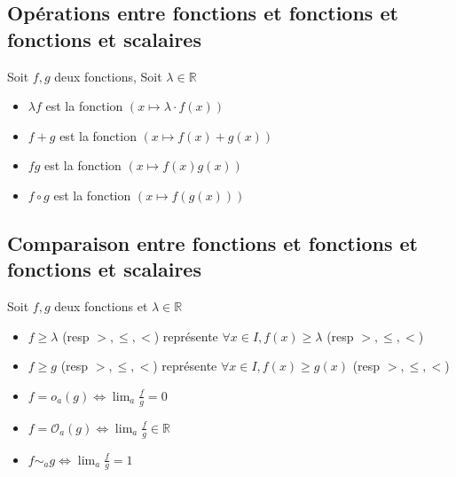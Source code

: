 \documentclass[11pt,colorlinks]{book}
\theoremstyle{mytheoremstyle}
\theoremstyle{mytheoremstyle}
\theoremstyle{mytheoremstyle}
\theoremstyle{mytheoremstyle}
\theoremstyle{mytheoremstyle}
\theoremstyle{mytheoremstyle}
\theoremstyle{mytheoremstyle}
\theoremstyle{mytheoremstyle}
\theoremstyle{myproblemstyle}
\def\mbb#1{\mathbb{#1}}
\def\bR{\mbb{R}}
\renewcommand{\equiv}{\sim}
\begin{document}
\subsection{Opérations entre fonctions et fonctions et fonctions et scalaires}
\begin{rmq}
  Soit $f,g$ deux fonctions, Soit $\lambda \in \bR$
  \begin{itemize}
    \item $\lambda f$ est la fonction $\left(x \mapsto \lambda \cdot f(x)\right)$
    \item $f+g$ est la fonction $\left(x \mapsto f(x)+g(x)\right)$
    \item $fg$ est la fonction $\left(x \mapsto f(x)g(x)\right)$
    \item $f \circ g$ est la fonction $\left(x \mapsto f(g(x))\right)$
  \end{itemize}
\end{rmq}
\subsection{Comparaison entre fonctions et fonctions et fonctions et scalaires}
\begin{rmq}
  Soit $f,g$ deux fonctions et $\lambda \in \bR$
  \begin{itemize}
  \item $f \geq \lambda$ (resp $>, \leq, <$) représente $\forall x \in I, f(x) \geq \lambda$ (resp $>,\leq,<$)
  \item $f \geq g$ (resp $>,\leq,<$) représente $\forall x \in I, f(x) \geq g(x)$ (resp $>,\leq,<$)
  \item $f = o_a(g) \Leftrightarrow \lim_a \frac{f}{g} = 0$
  \item $f = \mathcal{O}_a(g) \Leftrightarrow \lim_a \frac{f}{g} \in \bR$
  \item $f \equiv_a g \Leftrightarrow \lim_a \frac{f}{g} = 1$
  \end{itemize}
\end{rmq}
\end{document}
